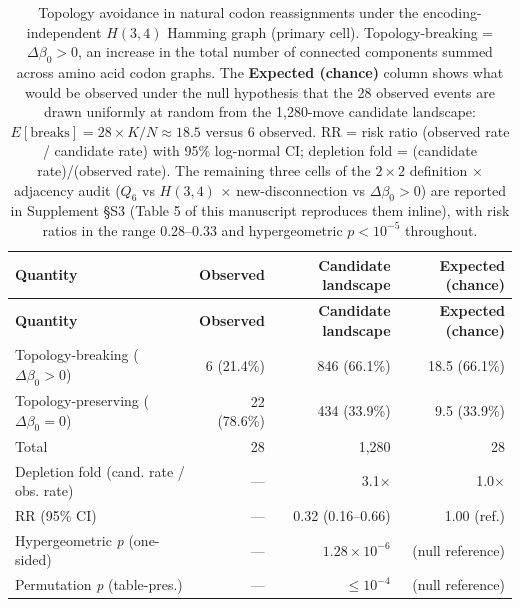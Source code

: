 \documentclass[preprint,11pt,authoryear,a4paper]{elsarticle}
\begin{document}
\begin{longtable}[]{@{}lrrr@{}}
\caption{Topology avoidance in natural codon reassignments under the
encoding-independent \(H(3,4)\) Hamming graph (primary cell).
Topology-breaking = \(\Delta\beta_{0} > 0\), an increase in the total
number of connected components summed across amino acid codon graphs.
The \textbf{Expected (chance)} column shows what would be observed under
the null hypothesis that the 28 observed events are drawn uniformly at
random from the 1,280-move candidate landscape:
\(E\left\lbrack \text{breaks} \right\rbrack = 28 \times K/N \approx 18.5\)
versus 6 observed. RR = risk ratio (observed rate / candidate rate) with
95\% log-normal CI; depletion fold = (candidate rate)/(observed rate).
The remaining three cells of the \(2 \times 2\) definition \(\times\)
adjacency audit (\(Q_{6}\) vs \(H(3,4)\) \(\times\) new-disconnection vs
\(\Delta\beta_{0} > 0\)) are reported in Supplement §S3 (Table 5 of this
manuscript reproduces them inline), with risk ratios in the range
0.28--0.33 and hypergeometric \(p < 10^{- 5}\)
throughout.}\tabularnewline
\toprule\noalign{}
\textbf{Quantity} & \textbf{Observed} & \textbf{Candidate landscape} &
\textbf{Expected (chance)} \\
\midrule\noalign{}
\endfirsthead
\toprule\noalign{}
\textbf{Quantity} & \textbf{Observed} & \textbf{Candidate landscape} &
\textbf{Expected (chance)} \\
\midrule\noalign{}
\endhead
\bottomrule\noalign{}
\endlastfoot
Topology-breaking (\(\Delta\beta_{0} > 0\)) & 6 (21.4\%) & 846 (66.1\%)
& 18.5 (66.1\%) \\
Topology-preserving (\(\Delta\beta_{0} = 0\)) & 22 (78.6\%) & 434
(33.9\%) & 9.5 (33.9\%) \\
Total & 28 & 1,280 & 28 \\
Depletion fold (cand. rate / obs. rate) & --- & 3.1\(\times\) &
1.0\(\times\) \\
RR (95\% CI) & --- & 0.32 (0.16--0.66) & 1.00 (ref.) \\
Hypergeometric \emph{p} (one-sided) & --- & \(1.28 \times 10^{- 6}\) &
(null reference) \\
Permutation \emph{p} (table-pres.) & --- & \(\leq 10^{- 4}\) & (null
reference) \\
\end{longtable}

\protect{}\label{tbl:topo}{}
\end{document}
